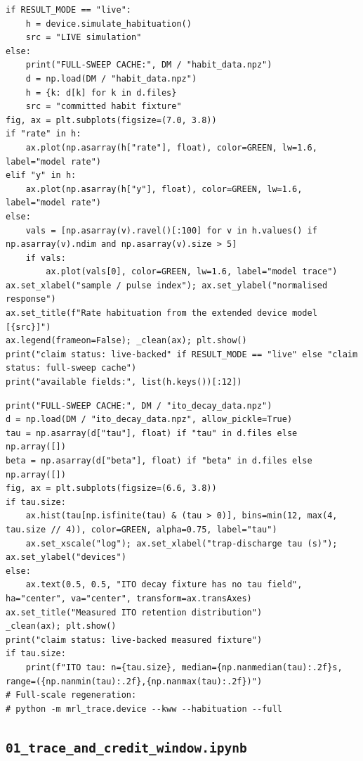 \begin{lstlisting}[caption={device\_model.ipynb code cell 3},label={lst:mrl-nb-device-model-3}]
if RESULT_MODE == "live":
    h = device.simulate_habituation()
    src = "LIVE simulation"
else:
    print("FULL-SWEEP CACHE:", DM / "habit_data.npz")
    d = np.load(DM / "habit_data.npz")
    h = {k: d[k] for k in d.files}
    src = "committed habit fixture"
fig, ax = plt.subplots(figsize=(7.0, 3.8))
if "rate" in h:
    ax.plot(np.asarray(h["rate"], float), color=GREEN, lw=1.6, label="model rate")
elif "y" in h:
    ax.plot(np.asarray(h["y"], float), color=GREEN, lw=1.6, label="model rate")
else:
    vals = [np.asarray(v).ravel()[:100] for v in h.values() if np.asarray(v).ndim and np.asarray(v).size > 5]
    if vals:
        ax.plot(vals[0], color=GREEN, lw=1.6, label="model trace")
ax.set_xlabel("sample / pulse index"); ax.set_ylabel("normalised response")
ax.set_title(f"Rate habituation from the extended device model [{src}]")
ax.legend(frameon=False); _clean(ax); plt.show()
print("claim status: live-backed" if RESULT_MODE == "live" else "claim status: full-sweep cache")
print("available fields:", list(h.keys())[:12])
\end{lstlisting}

\begin{lstlisting}[caption={device\_model.ipynb code cell 4},label={lst:mrl-nb-device-model-4}]
print("FULL-SWEEP CACHE:", DM / "ito_decay_data.npz")
d = np.load(DM / "ito_decay_data.npz", allow_pickle=True)
tau = np.asarray(d["tau"], float) if "tau" in d.files else np.array([])
beta = np.asarray(d["beta"], float) if "beta" in d.files else np.array([])
fig, ax = plt.subplots(figsize=(6.6, 3.8))
if tau.size:
    ax.hist(tau[np.isfinite(tau) & (tau > 0)], bins=min(12, max(4, tau.size // 4)), color=GREEN, alpha=0.75, label="tau")
    ax.set_xscale("log"); ax.set_xlabel("trap-discharge tau (s)"); ax.set_ylabel("devices")
else:
    ax.text(0.5, 0.5, "ITO decay fixture has no tau field", ha="center", va="center", transform=ax.transAxes)
ax.set_title("Measured ITO retention distribution")
_clean(ax); plt.show()
print("claim status: live-backed measured fixture")
if tau.size:
    print(f"ITO tau: n={tau.size}, median={np.nanmedian(tau):.2f}s, range=({np.nanmin(tau):.2f},{np.nanmax(tau):.2f})")
# Full-scale regeneration:
# python -m mrl_trace.device --kww --habituation --full
\end{lstlisting}

\subsection{\texttt{01\_trace\_and\_credit\_window.ipynb}}

